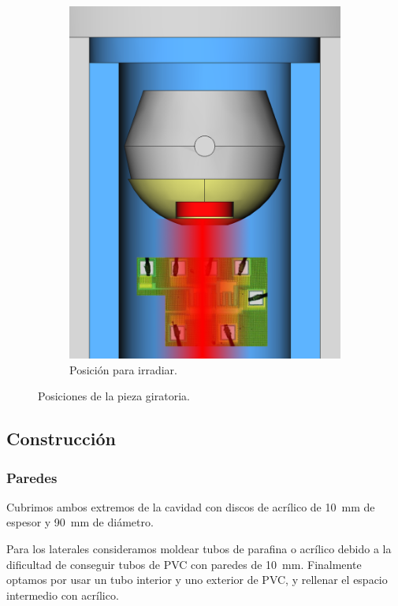\begin{figure}[H]
\begin{subfigure}[b]{.45\textwidth}
        \includegraphics{figuras/poster/posicion_si.png}
        \caption{Posición para irradiar.}
        \label{fig:posicionsi}
    \end{subfigure}
    \caption{Posiciones de la pieza giratoria.}
    \label{fig:posicionespieza}
\end{figure}
\subsection{Construcción}
\subsubsection{Paredes}
Cubrimos ambos extremos de la cavidad con discos de acrílico
de \SI{10}{\milli\meter} de espesor y \SI{90}{\milli\meter} de diámetro.

Para los laterales consideramos moldear tubos de parafina o acrílico
debido a la dificultad de conseguir tubos de PVC con paredes de
\SI{10}{\milli\meter}.
Finalmente optamos por usar un tubo interior y uno exterior de PVC,
y rellenar el espacio intermedio con acrílico.

